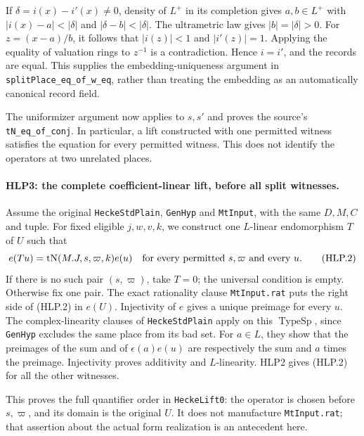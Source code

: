 If \(\delta=i(x)-i'(x)\ne0\), density of \(L^+\) in its completion
gives \(a,b\in L^+\) with
\(|i(x)-a|<|\delta|\) and \(|\delta-b|<|\delta|\).
The ultrametric law gives \(|b|=|\delta|>0\). For
\(z=(x-a)/b\), it follows that \(|i(z)|<1\) and
\(|i'(z)|=1\). Applying the equality of valuation rings to
\(z^{-1}\) is a contradiction. Hence \(i=i'\), and the records
are equal. This supplies the embedding-uniqueness argument in
\texttt{splitPlace\_eq\_of\_w\_eq}, rather than treating the
embedding as an automatically canonical record field.

The uniformizer argument now applies to \(s,s'\) and proves the
source's \texttt{tN\_eq\_of\_conj}. In particular, a lift constructed
with one permitted witness satisfies the equation for every
permitted witness. This does not identify the operators at two
unrelated places.

\paragraph{HLP3: the complete coefficient-linear lift, before all split witnesses.}
\label{claim:HLP3}
Assume the original \texttt{HeckeStdPlain}, \texttt{GenHyp} and
\texttt{MtInput}, with the same \(D,M,C\) and tuple. For fixed eligible
\(j,w,v,k\), we construct one \(L\)-linear endomorphism \(T\) of \(U\)
such that
\[
 e(Tu)=\operatorname{tN}(M.J,s,\varpi,k)e(u)
   \quad\hbox{for every permitted }s,\varpi\hbox{ and every }u. \tag{HLP.2}
\]
If there is no such pair \((s,\varpi)\), take \(T=0\); the universal
condition is empty. Otherwise fix one pair. The exact rationality
clause \texttt{MtInput.rat} puts the right side of (HLP.2) in
\(e(U)\). Injectivity of \(e\) gives a unique preimage for every \(u\).
The complex-linearity clauses of \texttt{HeckeStdPlain} apply on this
\(\operatorname{TypeSp}\), since \texttt{GenHyp} excludes the same
place from its bad set. For \(a\in L\), they show that the preimages
of the sum and of \(\epsilon(a)e(u)\) are respectively the sum and
\(a\) times the preimage. Injectivity proves additivity and
\(L\)-linearity. HLP2 gives (HLP.2) for all the other witnesses.

This proves the full quantifier order in \texttt{HeckeLift0}: the
operator is chosen before \(s,\varpi\), and its domain is the original
\(U\). It does not manufacture \texttt{MtInput.rat}; that assertion
about the actual form realization is an antecedent here.

